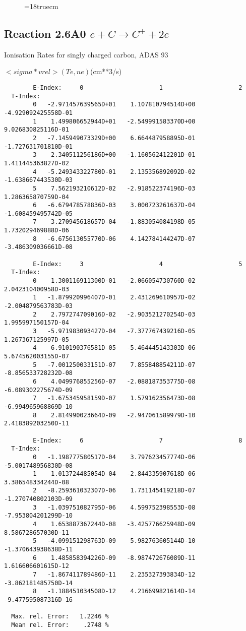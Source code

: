 \begin{figure} \label{2.2C}
\epsfxsize=18truecm
\end{figure}
\newpage


\subsection{
Reaction 2.6A0 $e + C \rightarrow C^+  + 2e $
}
  Ionisation Rates for singly charged carbon,
  ADAS 93

$ <sigma*vrel>(Te,ne) $(cm**3/s)
\begin{verbatim}
        E-Index:     0                     1                     2
  T-Index:
        0   -2.971457639565D+01    1.107810794514D+00   -4.929092425558D-01
        1    1.499806652944D+01   -2.549991583370D+00    9.026830825116D-01
        2   -7.145949073329D+00    6.664487958895D-01   -1.727631701810D-01
        3    2.340511256186D+00   -1.160562412201D-01    1.411445363827D-02
        4   -5.249343322780D-01    2.135356892092D-02   -1.638667443530D-03
        5    7.562193210612D-02   -2.918522374196D-03    1.286365870759D-04
        6   -6.679478578836D-03    3.000723261637D-04   -1.608459495742D-05
        7    3.270945618657D-04   -1.883054084198D-05    1.732029469888D-06
        8   -6.675613055770D-06    4.142784144247D-07   -3.486309036661D-08

        E-Index:     3                     4                     5
  T-Index:
        0    1.300116911300D-01   -2.066054730760D-02    2.042310400958D-03
        1   -1.879920996407D-01    2.431269610957D-02   -2.004879563783D-03
        2    2.797274709016D-02   -2.903521270254D-03    1.995997150157D-04
        3   -5.971983093427D-04   -7.377767439216D-05    1.267367125997D-05
        4    6.910190376581D-05   -5.464445143303D-06    5.674562003155D-07
        5   -7.001250033151D-07    7.855848854211D-07   -8.856533728232D-08
        6    4.049976855256D-07   -2.088187353775D-08   -6.089302275674D-09
        7   -1.675345958159D-07    1.579162356473D-08   -6.994965968869D-10
        8    2.814990023664D-09   -2.947061589979D-10    2.418389203250D-11

        E-Index:     6                     7                     8
  T-Index:
        0   -1.198777580517D-04    3.797623457774D-06   -5.001748956830D-08
        1    1.013724485054D-04   -2.844335907618D-06    3.386548334244D-08
        2   -8.259361032307D-06    1.731145419218D-07   -1.270740802103D-09
        3   -1.039751082795D-06    4.599752398553D-08   -7.953804201299D-10
        4    1.653887367244D-08   -3.425776625948D-09    8.586728657030D-11
        5   -4.099151298763D-09    5.982763605144D-10   -1.370643938638D-11
        6    1.485858394226D-09   -8.987472676089D-11    1.616606601615D-12
        7   -1.867411789486D-11    2.235327393834D-12   -3.862181485750D-14
        8   -1.188451034508D-12    4.216699821614D-14   -9.477595087316D-16

  Max. rel. Error:   1.2246 %
  Mean rel. Error:    .2748 %
\end{verbatim}
